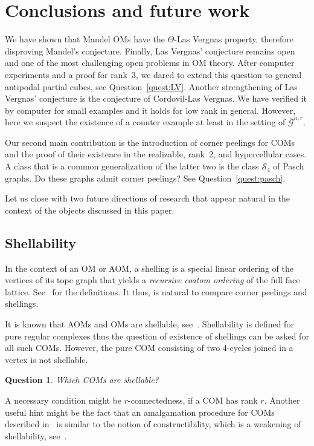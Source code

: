 \documentclass[final,11pt]{article}
\newtheorem{quest}{Question}
\begin{document}
\section{Conclusions and future work}
We have shown that Mandel OMs have the $\Theta$-Las Vergnas property, therefore disproving Mandel's conjecture. Finally, Las Vergnas' conjecture remains open and one of the most challenging open problems in OM theory. After computer experiments and a proof for rank~$3$, we dared to extend this question to general antipodal partial cubes, see Question~\ref{quest:LV}. Another strengthening of Las Vergnas' conjecture is the conjecture of Cordovil-Las Vergnas. We have verified it by computer for small examples and it holds for low rank in general. However, here we suspect the existence of a counter example at least in the setting of $\overline{\mathcal{G}}^{n,r}$.

Our second main contribution is the introduction of corner peelings for COMs and the proof of their existence in the realizable, rank~$2$, and hypercellular cases. A class that is a common generalization of the latter two is the class $\mathcal{S}_4$ of Pasch graphs. Do these graphs admit corner peelings? See Question~\ref{quest:pasch}.  

Let us close with two future directions of research that appear natural in the context of the objects discussed in this paper.

\subsection{Shellability}
In the context of an OM or AOM, a shelling is a special linear ordering of the vertices of its tope graph that yields a
\emph{recursive coatom ordering} of the full face lattice. See~\cite{bjvestwhzi-93} for the definitions. 
It thus, is natural to compare corner peelings and shellings.

It is known that AOMs and OMs are shellable, see~\cite{bjvestwhzi-93}. Shellability is defined for pure regular complexes thus the question of existence of shellings can be asked for all such COMs. However, the pure COM consisting of two 4-cycles joined in a vertex is not shellable.
\begin{quest}
Which COMs are shellable?
\end{quest}
A necessary condition might be $r$-connectedness, if a COM has rank $r$. Another useful hint might be the fact that an amalgamation procedure for COMs described in~\cite{Ban-18} is similar to the notion of constructibility, which is a weakening of shellability, see~\cite{hac-00}.
\end{document}
